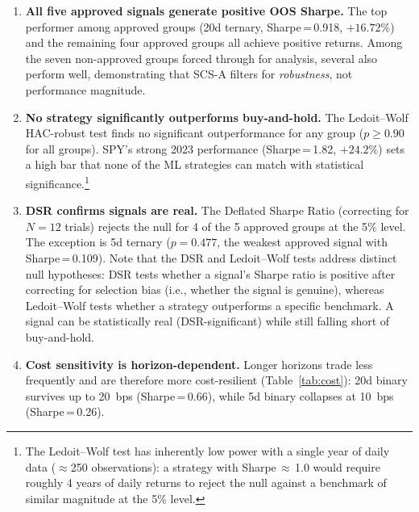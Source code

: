 \documentclass[12pt,a4paper]{article}
\begin{document}
\begin{enumerate}
  \item \textbf{All five approved signals generate positive OOS Sharpe.} The top performer among approved groups (20d ternary, Sharpe\,=\,0.918, $+16.72\%$) and the remaining four approved groups all achieve positive returns. Among the seven non-approved groups forced through for analysis, several also perform well, demonstrating that SCS-A filters for \emph{robustness}, not performance magnitude.

  \item \textbf{No strategy significantly outperforms buy-and-hold.} The Ledoit--Wolf HAC-robust test finds no significant outperformance for any group ($p \geq 0.90$ for all groups). SPY's strong 2023 performance (Sharpe\,=\,1.82, $+24.2\%$) sets a high bar that none of the ML strategies can match with statistical significance.\footnote{The Ledoit--Wolf test has inherently low power with a single year of daily data ($\approx$250 observations): a strategy with Sharpe\,$\approx$\,1.0 would require roughly 4 years of daily returns to reject the null against a benchmark of similar magnitude at the 5\% level.}

  \item \textbf{DSR confirms signals are real.} The Deflated Sharpe Ratio (correcting for $N=12$ trials) rejects the null for 4 of the 5 approved groups at the 5\% level. The exception is 5d ternary ($p=0.477$, the weakest approved signal with Sharpe\,=\,0.109). Note that the DSR and Ledoit--Wolf tests address distinct null hypotheses: DSR tests whether a signal's Sharpe ratio is positive after correcting for selection bias (i.e., whether the signal is genuine), whereas Ledoit--Wolf tests whether a strategy outperforms a specific benchmark. A signal can be statistically real (DSR-significant) while still falling short of buy-and-hold.

  \item \textbf{Cost sensitivity is horizon-dependent.} Longer horizons trade less frequently and are therefore more cost-resilient (Table~\ref{tab:cost}): 20d binary survives up to 20~bps (Sharpe\,=\,0.66), while 5d binary collapses at 10~bps (Sharpe\,=\,0.26).
\end{enumerate}
\end{document}
